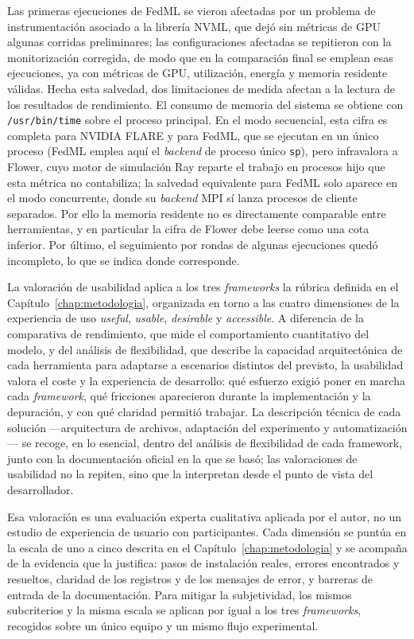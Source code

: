 Las primeras ejecuciones de FedML se vieron afectadas por un problema de instrumentación
asociado a la librería NVML, que dejó sin métricas de GPU algunas corridas preliminares; las
configuraciones afectadas se repitieron con la monitorización corregida, de modo que en la
comparación final se emplean esas ejecuciones, ya con métricas de GPU, utilización, energía y
memoria residente válidas. Hecha esta salvedad, dos limitaciones de medida afectan a la lectura
de los resultados de rendimiento. El consumo de memoria del sistema se obtiene con
\texttt{/usr/bin/time} sobre el proceso principal. En el modo secuencial, esta cifra es completa
para NVIDIA FLARE y para FedML, que se ejecutan en un único proceso (FedML emplea aquí el
\textit{backend} de proceso único \texttt{sp}), pero infravalora a Flower, cuyo motor de
simulación Ray reparte el trabajo en procesos hijo que esta métrica no contabiliza; la salvedad
equivalente para FedML solo aparece en el modo concurrente, donde su \textit{backend} MPI sí
lanza procesos de cliente separados. Por ello la memoria residente no es directamente comparable
entre herramientas, y en particular la cifra de Flower debe leerse como una cota inferior. Por
último, el seguimiento por rondas de algunas ejecuciones quedó incompleto, lo que se indica donde
corresponde.

La valoración de usabilidad aplica a los tres \textit{frameworks} la rúbrica
definida en el Capítulo~\ref{chap:metodologia}, organizada en torno a las cuatro
dimensiones de la experiencia de uso \textit{useful}, \textit{usable},
\textit{desirable} y \textit{accessible}. A diferencia de la comparativa de
rendimiento, que mide el comportamiento cuantitativo del modelo, y del análisis de
flexibilidad, que describe la capacidad arquitectónica de cada herramienta para
adaptarse a escenarios distintos del previsto, la usabilidad valora el coste y la
experiencia de desarrollo: qué esfuerzo exigió poner en marcha cada
\textit{framework}, qué fricciones aparecieron durante la implementación y la
depuración, y con qué claridad permitió trabajar. La descripción técnica de cada solución 
—arquitectura de archivos, adaptación del experimento y automatización— se recoge, en lo esencial,
dentro del análisis de flexibilidad de cada framework, junto con la documentación oficial en la que
se basó; las valoraciones de usabilidad no la repiten, sino que la interpretan
desde el punto de vista del desarrollador.

Esa valoración es una evaluación experta cualitativa aplicada por el autor, no un
estudio de experiencia de usuario con participantes. Cada dimensión se puntúa en la
escala de uno a cinco descrita en el Capítulo~\ref{chap:metodologia} y se acompaña de
la evidencia que la justifica: pasos de instalación reales, errores encontrados y
resueltos, claridad de los registros y de los mensajes de error, y barreras de
entrada de la documentación. Para mitigar la subjetividad, los mismos subcriterios y
la misma escala se aplican por igual a los tres \textit{frameworks}, recogidos sobre
un único equipo y un mismo flujo experimental.

